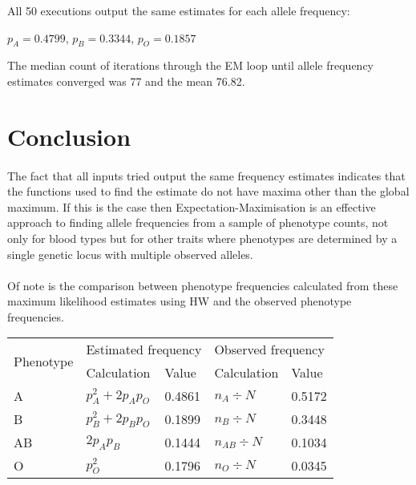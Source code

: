 \documentclass{article}
\begin{document}
	All 50 executions output the same estimates for each allele frequency:
	
	\begin{center} $p_A = 0.4799$, $p_B = 0.3344$, $p_O = 0.1857$ \end{center}
	
	The median count of iterations through the EM loop until allele frequency estimates converged was 77 and the mean 76.82. 
	
	\section{Conclusion}
	
	\paragraph{}The fact that all inputs tried output the same frequency estimates indicates that the functions used to find the estimate do not have maxima other than the global maximum. If this is the case then Expectation-Maximisation is an effective approach to finding allele frequencies from a sample of phenotype counts, not only for blood types but for other traits where phenotypes are determined by a single genetic locus with multiple observed alleles.  
	
	\paragraph{}Of note is the comparison between phenotype frequencies calculated from these maximum likelihood estimates using HW and the observed phenotype frequencies.
	\begin{table}[H]
		\centering
		\begin{tabular}{l|ll|ll}
			\multirow{2}{*}{Phenotype} & \multicolumn{2}{l|}{Estimated frequency}  & \multicolumn{2}{l}{Observed frequency}    \\ \cline{2-5} 
			& \multicolumn{1}{l|}{Calculation} & Value  & \multicolumn{1}{l|}{Calculation} & Value  \\ \hline
			A                          & $p_A^2 + 2p_Ap_O$                & 0.4861 & $n_A \div N$                     & 0.5172 \\
			B                          & $p_B^2 + 2p_Bp_O$                & 0.1899 & $n_B \div N$                     & 0.3448 \\
			AB                         & $2p_Ap_B$                        & 0.1444 & $n_{AB} \div N$                  & 0.1034 \\
			O                          & $p_O^2$                          & 0.1796 & $n_O \div N$                     & 0.0345
		\end{tabular}
	\end{table}
\end{document}
